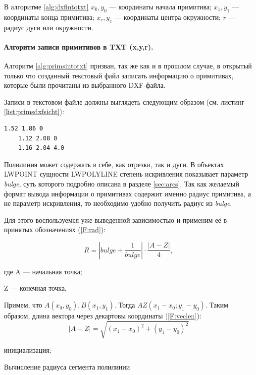 В алгоритме \ref{alg:dxfintotxt} $x_0, y_0$ --- координаты начала примитива; $x_1, y_1$ --- координаты конца примитива; $x_c, y_c$ --- координаты центра окружности; $r$ --- радиус дуги или окружности.

\paragraph{Алгоритм записи примитивов в TXT (x,y,r).} Алгоритм \ref{alg:primsintotxt} призван, так же как и в прошлом случае, в открытый только что созданный текстовый файл записать информацию о примитивах, которые были прочитаны из выбранного DXF-файла.

Записи в текстовом файле должны выглядеть следующим образом (см. листинг \ref{list:primsdxfsicht}):

\begin{lstlisting}[caption={Пример содержания TXT-файла (x, y, r)},label=list:primsdxfsicht]
	1.52 1.86 0
	1.12 2.08 0
	1.16 2.04 4.0
\end{lstlisting}

Полилиния может содержать в себе, как отрезки, так и дуги. В объектах LWPOINT сущности LWPOLYLINE степень искривления показывает параметр \textit{bulge}, суть которого подробно описана в разделе \ref{sec:arcs}. Так как желаемый формат вывода информации о примитивах содержит именно радиус примитива, а не параметр искривления, то необходимо удобно получить радиус из \textit{bulge}.

Для этого воспользуемся уже выведенной зависимостью \cite{ukoloff} и применим её в принятых обозначениях (\ref{F:rad}):

\begin{equation}
	R=|bulge+\frac{1}{bulge}|\cdot\frac{|A-Z|}{4},
	\label{F:rad}
\end{equation}

где A --- начальная точка;

Z --- конечная точка.

Примем, что $A(x_0,y_0), B(x_1,y_1)$. Тогда $AZ(x_1-x_0; y_1-y_0)$.
Таким образом, длина вектора через декартовы координаты (\ref{F:veclen}):
\begin{equation}
	|A-Z|=\sqrt{(x_1-x_0)^2+(y_1-y_0)^2}
	\label{F:veclen}
\end{equation}


\begin{algorithm}[H]
	\SetAlgoLined
	инициализация;
	
	
	\caption{Вычисление радиуса сегмента полилинии}
	\label{alg:polyarcrad}
\end{algorithm}

